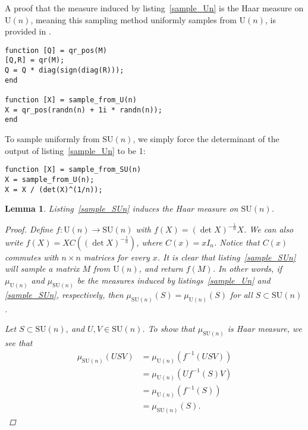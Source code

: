 \documentclass[letterpaper,11pt]{article}
\newtheorem{lemma}{Lemma}
\newcommand{\MG}[2]{{\text{#1}(#2)}}
\newcommand{\Un}{\MG{U}{n}}
\newcommand{\SUn}{\MG{SU}{n}}
\begin{document}
A proof that the measure induced by listing~\ref{sample_Un} is the Haar
  measure on $\Un$, meaning this sampling method uniformly samples from $\Un$,
  is provided in \cite{Mezzadri2007}.

\begin{lstlisting}[label=sample_Un,caption=Sampling from $\Un$]
function [Q] = qr_pos(M)
[Q,R] = qr(M);
Q = Q * diag(sign(diag(R)));
end

function [X] = sample_from_U(n)
X = qr_pos(randn(n) + 1i * randn(n));
end
\end{lstlisting}

To sample uniformly from $\SUn$, we simply force the determinant of the
  output of listing~\ref{sample_Un} to be 1:

\begin{lstlisting}[label=sample_SUn,caption=Sampling from $\SUn$]
function [X] = sample_from_SU(n)
X = sample_from_U(n);
X = X / (det(X)^(1/n));
\end{lstlisting}

\begin{lemma}
Listing~\ref{sample_SUn} induces the Haar measure on $\SUn$.

\begin{proof}
Define $f:\Un\to\SUn$ with $f(X) = (\det X)^{-\frac{1}{n}}X$.
We can also write $f(X) = XC((\det X)^{-\frac{1}{n}})$, where $C(x)=xI_n$.
Notice that $C(x)$ commutes with $n\times n$ matrices for every $x$.
It is clear that listing~\ref{sample_SUn} will sample a matrix $M$ from $\Un$,
  and return $f(M)$.
In other words, if $\mu_\Un$ and $\mu_\SUn$ be the measures induced by
  listings~\ref{sample_Un} and \ref{sample_SUn}, respectively, then
  $\mu_\SUn(S) = \mu_\Un(S)$ for all $S\subset\SUn$.

Let $S\subset \SUn$, and $U,V\in \SUn$.
To show that $\mu_\SUn$ is Haar measure, we see that
\begin{align}
  \mu_\SUn\left(USV\right)  &= \mu_\Un\left(f^{-1}(USV)\right) \\
                            &= \mu_\Un\left(Uf^{-1}(S)V\right) \\
                            &= \mu_\Un\left(f^{-1}(S)\right) \\
                            &= \mu_\SUn\left(S\right).
\end{align}
\end{proof}
\end{lemma}

\thispagestyle{empty}


\end{document}
